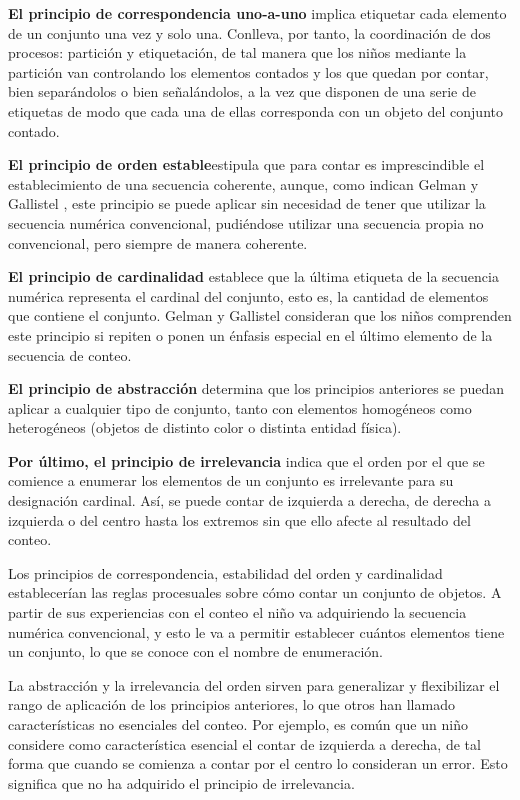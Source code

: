 \documentclass{article}
\begin{document}
\textbf{El principio de correspondencia uno-a-uno}  implica etiquetar cada elemento de un conjunto una vez y solo una. Conlleva, por tanto, la coordinación de dos procesos: partición y etiquetación, de tal manera que los niños mediante la partición van controlando los elementos contados y los que quedan por contar, bien separándolos o bien señalándolos, a la vez que disponen de una serie de etiquetas de modo que cada una de ellas corresponda con un objeto del conjunto contado. 

\textbf{El principio de orden estable}estipula que para contar es imprescindible el establecimiento de una secuencia coherente, aunque, como indican Gelman y Gallistel \cite{german1978child}, este principio se puede aplicar sin necesidad de tener que utilizar la secuencia numérica convencional, pudiéndose utilizar una secuencia propia no convencional, pero siempre de manera coherente.

\textbf{El principio de cardinalidad} establece que la última etiqueta de la secuencia numérica representa el cardinal del conjunto, esto es, la cantidad de elementos que contiene el conjunto. Gelman y Gallistel \cite{german1978child} consideran que los niños comprenden este principio si repiten o ponen un énfasis especial en el último elemento de la secuencia de conteo.

\textbf{El principio de abstracción} determina que los principios anteriores se puedan aplicar a cualquier tipo de conjunto, tanto con elementos homogéneos como heterogéneos (objetos de distinto color o distinta entidad física).

\textbf{Por último, el principio de irrelevancia }indica que el orden por el que se comience a enumerar los elementos de un conjunto es irrelevante para su designación cardinal. Así, se puede contar de izquierda a derecha, de derecha a izquierda o del centro hasta los extremos sin que ello afecte al resultado del conteo.

Los principios de correspondencia, estabilidad del orden y cardinalidad establecerían las reglas procesuales sobre cómo contar un conjunto de objetos. A partir de sus experiencias con el conteo el niño va adquiriendo la secuencia numérica convencional, y esto le va a permitir establecer cuántos elementos tiene un conjunto, lo que se conoce con el nombre de enumeración.

La abstracción y la irrelevancia del orden sirven para generalizar y flexibilizar el rango de aplicación de los principios anteriores, lo que otros han llamado características no esenciales del conteo. Por ejemplo, es común que un niño considere como característica esencial el contar de izquierda a derecha, de tal forma que cuando se comienza a contar por el centro lo consideran un error. Esto significa que no ha adquirido el principio de irrelevancia.
\end{document}
